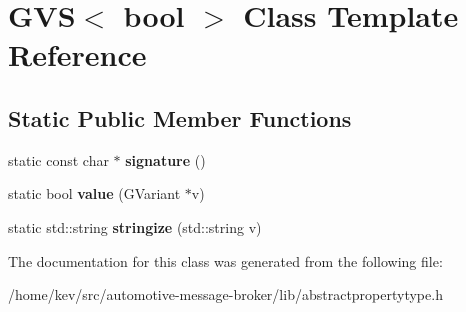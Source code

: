 \hypertarget{classGVS_3_01bool_01_4}{\section{G\-V\-S$<$ bool $>$ Class Template Reference}
\label{classGVS_3_01bool_01_4}
}
\subsection*{Static Public Member Functions}
\begin{DoxyCompactItemize}
\item 
\hypertarget{classGVS_3_01bool_01_4_a81cb01e07ccf7830cce75abcc4a2cca8}{static const char $\ast$ {\bfseries signature} ()}\label{classGVS_3_01bool_01_4_a81cb01e07ccf7830cce75abcc4a2cca8}

\item 
\hypertarget{classGVS_3_01bool_01_4_affd787db6c549ec8bee51862fc51f211}{static bool {\bfseries value} (G\-Variant $\ast$v)}\label{classGVS_3_01bool_01_4_affd787db6c549ec8bee51862fc51f211}

\item 
\hypertarget{classGVS_3_01bool_01_4_a3f5e4da1a15517ae3e700c3a1b70fea7}{static std\-::string {\bfseries stringize} (std\-::string v)}\label{classGVS_3_01bool_01_4_a3f5e4da1a15517ae3e700c3a1b70fea7}

\end{DoxyCompactItemize}


The documentation for this class was generated from the following file\-:\begin{DoxyCompactItemize}
\item 
/home/kev/src/automotive-\/message-\/broker/lib/abstractpropertytype.\-h\end{DoxyCompactItemize}
